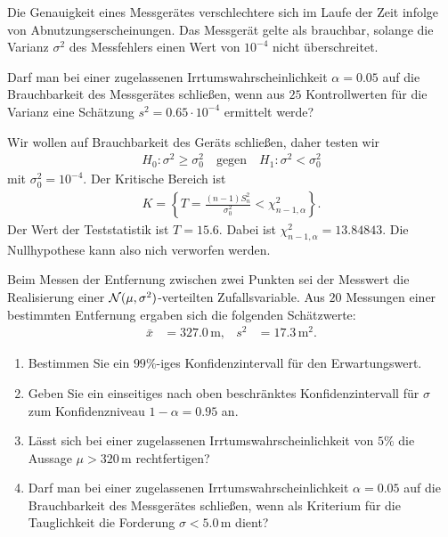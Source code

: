 Die Genauigkeit eines Messgerätes verschlechtere
sich im Laufe der Zeit infolge von Abnutzungserscheinungen. Das Messgerät gelte
als brauchbar, solange die Varianz $\sigma^2$ des Messfehlers einen Wert von
$10^{-4}$ nicht überschreitet.

Darf man bei einer zugelassenen Irrtumswahrscheinlichkeit $\alpha=0.05$ auf die
Brauchbarkeit des Messgerätes schließen, wenn aus $25$ Kontrollwerten für die
Varianz eine Schätzung $s^2 = 0.65 \cdot{} 10^{-4}$ ermittelt werde? 

\solution Wir wollen auf Brauchbarkeit des Geräts schließen, daher 
testen wir
\begin{align*}
    H_0 : \sigma^2 \geq \sigma^2_0 \quad\text{gegen}\quad H_1 : \sigma^2 < \sigma^2_0 
\end{align*}
mit $\sigma^2_0=10^{-4}$. Der Kritische Bereich ist 
\begin{align*}
    K = \left\{ T = \frac{(n-1) S^2_n}{\sigma^2_0} < \chi^2_{n-1, \alpha}   \right\}.
\end{align*}
Der Wert der Teststatistik ist $T = 15.6$. Dabei ist $\chi^2_{n-1, \alpha} =
13.84843$. Die Nullhypothese kann also nich verworfen werden. 

 Beim Messen der
Entfernung zwischen zwei Punkten sei der Messwert die Realisierung einer
$\mathcal N(\mu,\sigma^2)$-verteilten Zufallsvariable. Aus $20$ Messungen einer
bestimmten Entfernung ergaben sich die folgenden Schätzwerte:
\begin{align*}
    \bar x &= 327.0\,\text{m}, & s^2 &= 17.3\, \text{m}^2.
\end{align*}
\begin{enumerate}
    \item Bestimmen Sie ein $99\%$-iges Konfidenzintervall für den Erwartungswert.
    \item Geben Sie ein einseitiges nach oben beschränktes Konfidenzintervall für 
        $\sigma$ zum Konfidenzniveau $1-\alpha = 0.95$ an. 
    \item Lässt sich bei einer zugelassenen Irrtumswahrscheinlichkeit von $5\%$ die Aussage
        $\mu>320\,\text{m}$ rechtfertigen?
    \item Darf man bei einer zugelassenen Irrtumswahrscheinlichkeit $\alpha=0.05$ auf die
        Brauchbarkeit des Messgerätes schließen, wenn als Kriterium für die Tauglichkeit
        die Forderung $\sigma<5.0\,\text{m}$ dient?
\end{enumerate}

